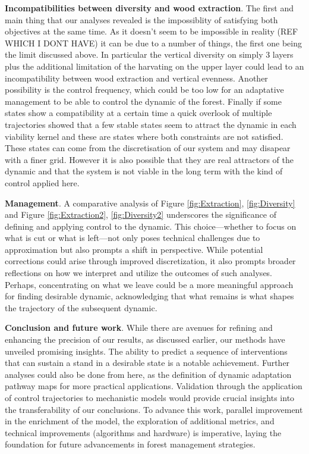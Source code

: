 \documentclass{article}
\begin{document}
\textbf{Incompatibilities between diversity and wood extraction}. The first and main thing that our analyses revealed is the impossiblity of satisfying both objectives at the same time. As it doesn't seem to be impossible in reality (REF WHICH I DONT HAVE) it can be due to a number of things, the first one being the limit discussed above. In particular the vertical diversity on simply 3 layers plus the additional limitation of the harvating on the upper layer could lead to an incompatibility between wood extraction and vertical evenness. Another possibility is the control frequency, which could be too low for an adaptative management to be able to control the dynamic of the forest. Finally if some states show a compatibility at a certain time a quick overlook of multiple trajectories showed that a few stable states seem to attract the dynamic in each viability kernel and these are states where both constraints are not satisfied. These states can come from the discretisation of our system and may disapear with a finer grid. However it is also possible that they are real attractors of the dynamic and that the system is not viable in the long term with the kind of control applied here.

\textbf{Management}. A comparative analysis of Figure \ref{fig:Extraction}, \ref{fig:Diversity} and Figure \ref{fig:Extraction2}, \ref{fig:Diversity2} underscores the significance of defining and applying control to the dynamic. This choice—whether to focus on what is cut or what is left—not only poses technical challenges due to approximation but also prompts a shift in perspective. While potential corrections could arise through improved discretization, it also prompts broader reflections on how we interpret and utilize the outcomes of such analyses. Perhaps, concentrating on what we leave could be a more meaningful approach for finding  desirable dynamic, acknowledging that what remains is what shapes the trajectory of the subsequent dynamic.

\textbf{Conclusion and future work}. While there are avenues for refining and enhancing the precision of our results, as discussed earlier, our methods have unveiled promising insights. The ability to predict a sequence of interventions that can sustain a stand in a desirable state is a notable achievement. Further analyses could also be done from here, as the definition of dynamic adaptation pathway maps for more practical applications. Validation through the application of control trajectories to mechanistic models would provide crucial insights into the transferability of our conclusions. To advance this work, parallel improvement in the enrichment of the model, the exploration of additional metrics, and technical improvements (algorithms and hardware) is imperative, laying the foundation for future advancements in forest management strategies.
\end{document}
